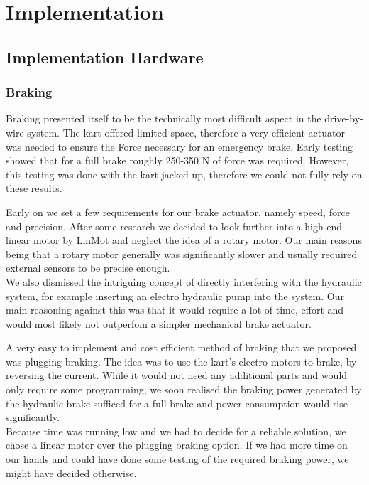 
\chapter{Implementation}
\label{chp:Implementation}

\section{Implementation Hardware}

\subsection{Braking}

Braking presented itself to be the technically most difficult aspect in the drive-by-wire system. The kart offered limited space, therefore a very efficient actuator was needed to ensure the Force necessary for an emergency brake. Early testing showed that for a full brake roughly 250-350 N of force was required. However, this testing was done with the kart jacked up, therefore we could not fully rely on these results.

Early on we set a few requirements for our brake actuator, namely speed, force and precision. After some research we decided to look further into a high end linear motor by LinMot and neglect the idea of a rotary motor. Our main reasons being that a rotary motor generally was significantly slower and usually required external sensors to be precise enough.\\
We also dismissed the intriguing concept of directly interfering with the hydraulic system, for example inserting an electro hydraulic pump into the system. Our main reasoning against this was that it would require a lot of time, effort and would most likely not outperfom a simpler mechanical brake actuator.

A very easy to implement and cost efficient method of braking that we proposed was plugging braking. The idea was to use the kart's electro motors to brake, by reversing the current. While it would not need any additional parts and would only require some programming, we soon realised the braking power generated by the hydraulic brake sufficed for a full brake and power consumption would rise significantly. \\Because time was running low and we had to decide for a reliable solution, we chose a linear motor over the plugging braking option. If we had more time on our hands and could have done some testing of the required braking power, we might have decided otherwise.

